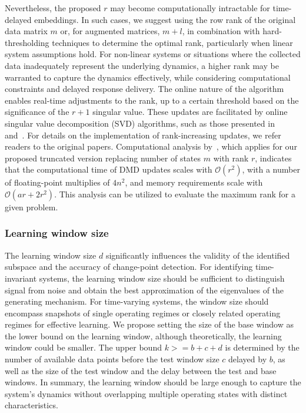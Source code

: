 Nevertheless, the proposed \( r \) may become computationally intractable for time-delayed embeddings. In such cases, we suggest using the row rank of the original data matrix \( m \) or, for augmented matrices, \( m + l \), in combination with hard-thresholding techniques to determine the optimal rank, particularly when linear system assumptions hold. For non-linear systems or situations where the collected data inadequately represent the underlying dynamics, a higher rank may be warranted to capture the dynamics effectively, while considering computational constraints and delayed response delivery. The online nature of the algorithm enables real-time adjustments to the rank, up to a certain threshold based on the significance of the \(r + 1\) singular value. These updates are facilitated by online singular value decomposition (SVD) algorithms, such as those presented in~\cite{Brand2006} and~\cite{Zhang2022}. For details on the implementation of rank-increasing updates, we refer readers to the original papers. Computational analysis by~\cite{Zhang2019}, which applies for our proposed truncated version replacing number of states \(m\) with rank \(r\), indicates that the computational time of DMD updates scales with \( \mathcal{O}(r^2) \), with a number of floating-point multiplies of \(4n^2\), and memory requirements scale with \( \mathcal{O}(a r + 2 r ^ 2) \). This analysis can be utilized to evaluate the maximum rank for a given problem.

\subsubsection{Learning window size}
The learning window size \(d\) significantly influences the validity of the identified subspace and the accuracy of change-point detection. For identifying time-invariant systems, the learning window size should be sufficient to distinguish signal from noise and obtain the best approximation of the eigenvalues of the generating mechanism. For time-varying systems, the window size should encompass snapshots of single operating regimes or closely related operating regimes for effective learning. We propose setting the size of the base window as the lower bound on the learning window, although theoretically, the learning window could be smaller. The upper bound \(k >= b + c + d\) is determined by the number of available data points before the test window size \(c\) delayed by \(b\), as well as the size of the test window and the delay between the test and base windows. In summary, the learning window should be large enough to capture the system's dynamics without overlapping multiple operating states with distinct characteristics.

